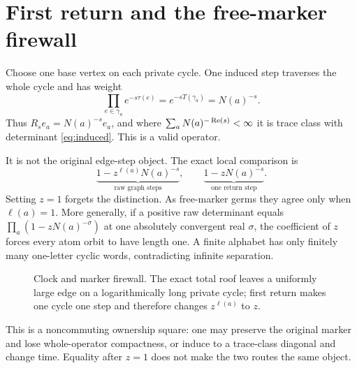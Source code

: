 \section{First return and the free-marker firewall}

Choose one base vertex on each private cycle.  One induced step traverses the
whole cycle and has weight
\[
\prod_{e\in\gamma_a}e^{-s\tau(e)}=e^{-sT(\gamma_a)}=N(a)^{-s}.
\]
Thus $R_se_a=N(a)^{-s}e_a$, and where
$\sum_aN(a)^{-\operatorname{Re}(s)}<\infty$ it is trace class with determinant
\eqref{eq:induced}.  This is a valid operator.

It is not the original edge-step object.  The exact local comparison is
\begin{equation}\label{eq:marker-pair}
\underbrace{1-z^{\ell(a)}N(a)^{-s}}_{\text{raw graph steps}},
\qquad
\underbrace{1-zN(a)^{-s}}_{\text{one return step}}.
\end{equation}
Setting $z=1$ forgets the distinction.  As free-marker germs they agree only
when $\ell(a)=1$.  More generally, if a positive raw determinant equals
$\prod_a(1-zN(a)^{-\sigma})$ at one absolutely convergent real $\sigma$, the
coefficient of $z$ forces every atom orbit to have length one.  A finite
alphabet has only finitely many one-letter cyclic words, contradicting
infinite separation.

\begin{figure}[t]
\centering

\caption{Clock and marker firewall.  The exact total roof leaves a uniformly
large edge on a logarithmically long private cycle; first return makes one
cycle one step and therefore changes $z^{\ell(a)}$ to $z$.}
\label{fig:marker}
\end{figure}

This is a noncommuting ownership square: one may preserve the original
marker and lose whole-operator compactness, or induce to a trace-class
diagonal and change time.  Equality after $z=1$ does not make the two routes
the same object.
